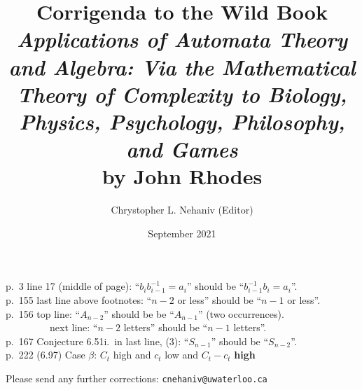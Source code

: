 \documentclass{article}
\title{Corrigenda to the Wild Book\\[1em]
{\em Applications of Automata Theory and Algebra: Via the Mathematical Theory of Complexity to Biology, Physics, Psychology, Philosophy, and Games} \\[1em] by John Rhodes}
\author{Chrystopher L. Nehaniv (Editor)}
\date{September 2021}
\begin{document}
\maketitle



p.\ 3 line 17 (middle of page):   ``$b_i b_{i-1}^{-1}=a_i$'' should be ``$b_{i-1}^{-1} b_i=a_i$''. \\

p.\ 155 last line above footnotes:   ``$n-2$ or less'' should be ``$n-1$ or less''.\\

p.\ 156 top line: ``$A_{n-2}$'' should be be ``$A_{n-1}$'' (two occurrences).\\

\ \ \ \ \ \ \ \ \  next line:  ``$n-2$ letters'' should be ``$n-1$ letters''.\\
 
p.\ 167 Conjecture 6.51i.\ in last line,  (3):   ``$S_{n-1}$'' should be ``$S_{n-2}$''.  \\


p.\ 222 (6.97) Case $\beta$:  $C_t$ high and $c_t$ low and $C_t-c_t$ {\bf high}

\vfill
Please send any further corrections:  {\tt cnehaniv@uwaterloo.ca}
\end{document}
